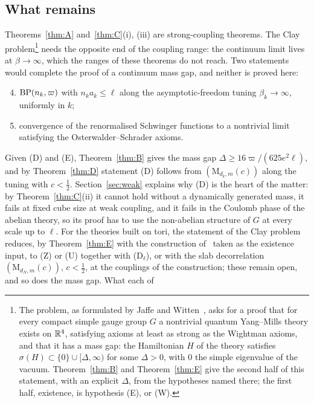 \subsection{What remains}\label{sec:remains}
\enlargethispage{3pt}

Theorems~\ref{thm:A} and~\ref{thm:C}(i), (iii) are strong-coupling theorems.
The Clay problem\footnote{The problem, as formulated by Jaffe and
Witten~\cite{JW06}, asks for a proof that for every compact simple gauge
group $G$ a nontrivial quantum Yang--Mills theory exists on $\mathbb{R}^4$,
satisfying axioms at least as strong as the Wightman axioms, and that it
has a mass gap: the Hamiltonian $H$ of the theory satisfies $\sigma(H)
\subset\{0\}\cup[\Delta,\infty)$ for some $\Delta>0$, with $0$ the simple
eigenvalue of the vacuum. Theorem~\ref{thm:B} and Theorem~\ref{thm:E} give
the second half of this statement, with an explicit $\Delta$, from the
hypotheses named there; the first half, existence, is hypothesis (E), or
(W).} needs the opposite end of the coupling range: the continuum
limit lives at $\beta\to\infty$, which the ranges of these theorems do not
reach. Two
statements would complete the proof of a continuum mass gap, and neither is
proved here:
\begin{enumerate}[label=\textup{(\Alph*)},leftmargin=*]
\setcounter{enumi}{3}
\item $\mathrm{BP}(n_k,\varpi)$ with $n_ka_k\le\ell$ along the asymptotic-freedom
tuning $\beta_k\to\infty$, uniformly in $k$;
\item convergence of the renormalised Schwinger functions to a nontrivial
limit satisfying the Osterwalder--Schrader axioms.
\end{enumerate}
Given (D) and (E), Theorem~\ref{thm:B} gives the mass gap $\Delta\ge
16\varpi/(625e^2\ell)$, and by Theorem~\ref{thm:D} statement (D) follows from
$(\mathrm M_{d_k,m}(c))$ along the tuning with $c<\frac12$. Section~\ref{sec:weak} explains why (D) is the heart of
the matter: by Theorem~\ref{thm:C}(ii) it cannot hold without a dynamically
generated mass, it fails at fixed cube size at weak coupling, and it fails in
the Coulomb phase of the abelian theory, so its proof has to use the
non-abelian structure of $G$ at every scale up to $\ell$. For the theories
built on tori, the statement of the Clay problem reduces, by
Theorem~\ref{thm:E} with the construction of~\cite{OAI26} taken as the
existence input, to (Z) or (U) together with (D$_\ell$), or with the slab
decorrelation $(\mathrm M_{d_N,m}(c))$, $c<\frac12$, at the couplings of the
construction; these remain open, and so does the mass gap. What each of
